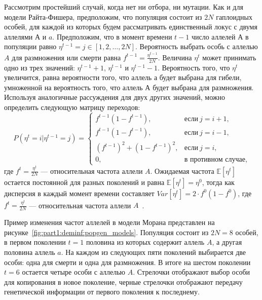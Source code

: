 Рассмотрим простейший случай, когда нет ни отбора, ни мутации. 
Как и для модели Райта-Фишера, предположим, что популяция состоит из $2N$ гаплоидных особей, для каждой из которых будем рассматривать единственный локус с двумя аллелями $А$ и $a$.
Предположим, что в момент времени $t-1$ число аллелей $А$ в популяции равно $\eta^{t-1} = j \in [1, 2, \dots, 2N]$.
Вероятность выбрать особь с аллелью $A$ для размножения или смерти равна $f^{t-1} = \frac{\eta^{t-1}}{2N}$.
Величина $\eta^{t}$ может принимать одно из трех значений: $\eta^{t-1} + 1$, $\eta^{t-1}$ и $\eta^{t-1} - 1$.
Вероятность того, что $\eta^{t}$ увеличится, равна вероятности того, что аллель $а$ будет выбрана для гибели, умноженной на вероятность того, что аллель $А$ будет выбрана для размножения.
Используя аналогичные рассуждения для двух других значений, можно определить следующую матрицу переходов:
\begin{equation*}
    P(\eta^{t}=i | \eta^{t-1}=j) = 
    \begin{cases}
      f^{t-1} (1 - f^{t-1}), & \text{если}\ j=i+1, \\
      f^{t-1} (1 - f^{t-1}), & \text{если}\ j=i-1, \\
      (f^{t-1})^2 + (1 - f^{t-1})^2, & \text{если}\ j=i, \\
      0, & \text{в противном случае,}
    \end{cases}
\end{equation*}
где $f^{t} = \frac{\eta^t}{2N}$ --- относительная частота аллели $A$.
Ожидаемая частота $\mathbb{E}[\eta^t]$ остается постоянной для разных поколений и равна $\mathbb{E}[\eta^t] = \eta^0$, тогда как дисперсия в каждый момент времени составляет $Var[\eta^t]=2\cdot f^0(1 - f^0)$, где $f^t = \frac{\eta^t}{2N}$ --- относительная частота аллели $A$~\cite{wakeley2009coalescent}.

Пример изменения частот аллелей в модели Морана представлен на рисунке~\ref{fig:part1:deminf:popgen_models}.
Популяция состоит из $2N = 8$ особей, в первом поколении $t=1$ половина из которых содержит аллель $A$, а другая половина аллель $a$.
На каждом из следующих пяти поколений выбирается две особи: одна для смерти и одна для размножения.
В итоге на шестом поколении $t=6$ остается четыре особи с аллелью $A$.
Стрелочки отображают выбор особи для копирования в новое поколение, черные стрелочки отображают передачу генетической информации от первого поколения к последнему.

